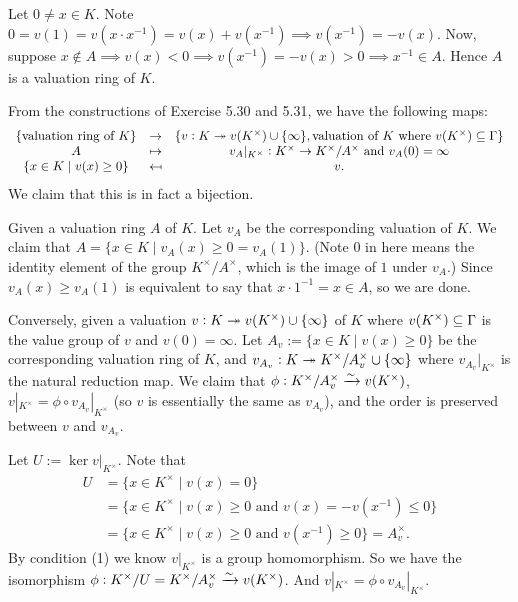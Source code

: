 \documentclass[../A&M.tex]{subfiles}
\begin{document}
Let $0 \neq x \in K$. Note $0 = v(1) = v(x\cdot x^{-1}) = v(x) + v(x^{-1}) \implies v(x^{-1}) = -v(x)$. Now, suppose $x\notin A \implies v(x) < 0 \implies v(x^{-1}) = -v(x) > 0 \implies x^{-1} \in A$. Hence $A$ is a valuation ring of $K$.

From the constructions of Exercise 5.30 and 5.31, we have the following maps:
$$
\begin{array}{ccc}
\{ \text{valuation ring of } K\} & \to & \{v:K \twoheadrightarrow v(K^\times) \cup \{\infty\}, \text{valuation of } K \text{ where } v(K^\times) \subseteq \Gamma \}   \\
A & \mapsto & v_A|_{K^\times}: K^\times \to K^\times/A^\times \text{ and } v_A(0) = \infty     \\
\{x \in K \mid v(x) \geq 0\} & \mapsfrom & v.
\end{array}
$$
We claim that this is in fact a bijection.

Given a valuation ring $A$ of $K$. Let $v_A$ be the corresponding valuation of $K$. We claim that $A = \{ x\in K \mid v_A(x) \geq 0 = v_A(1) \}$. (Note $0$ in here means the identity element of the group $K^\times/A^\times$, which is the image of $1$ under $v_A$.) Since $v_A(x) \geq v_A(1)$ is equivalent to say that $x \cdot 1^{-1} = x \in A$, so we are done.

Conversely, given a valuation $v:K \twoheadrightarrow v(K^\times) \cup \{\infty\}$ of $K$ where $v(K^\times) \subseteq \Gamma$ is the value group of $v$ and $v(0)=\infty$. Let $A_v := \{x \in K \mid v(x) \geq 0\}$ be the corresponding valuation ring of $K$, and $v_{A_v}: K \twoheadrightarrow K^\times/A_v^\times \cup \{\infty\}$ where $v_{A_v}|_{K^\times}$ is the natural reduction map. We claim that $\phi: K^\times/A_v^\times \xrightarrow{\sim} v(K^\times)  $, $v|_{K^\times} = \phi \circ v_{A_v}|_{K^\times}$ (so $v$ is essentially the same as $v_{A_v}$), and the order is preserved between $v$ and $v_{A_v}$.

Let $U:=\ker v|_{K^\times}$. Note that
\begin{align*}
U &= \{ x \in K^\times \mid v(x)=0 \}    \\
&= \{ x \in K^\times \mid v(x) \geq 0 \text{ and } v(x) = -v(x^{-1}) \leq 0 \}     \\
&= \{ x \in K^\times \mid v(x) \geq 0 \text{ and } v(x^{-1}) \geq 0 \} 
= A_v^\times.  
\end{align*}
By condition (1) we know $v|_{K^\times}$ is a group homomorphism. So we have the isomorphism $\phi: K^\times/U = K^\times/A_v^\times \xrightarrow{\sim} v(K^\times)$. And $v|_{K^\times} = \phi \circ v_{A_v}|_{K^\times}$.
\end{document}
